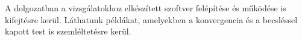 
A dolgozatban a vizsgálatokhoz elkészített szoftver felépítése és működése is kifejtésre kerül. Láthatunk példákat, amelyekben a konvergencia és a becsléssel kapott test is szemléltetésre kerül.

